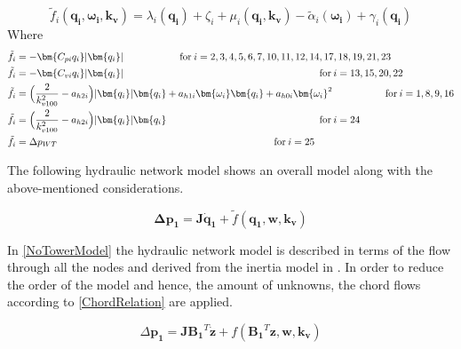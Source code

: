 
\begin{equation}
  \tilde{f}_i(\bm{q_{i}}, \bm{\omega_i}, \bm{k_v}) = \lambda_i(\bm{q_{i}}) + \zeta_i + \mu_i(\bm{q_{i}}, \bm{k_v}) - \tilde{\alpha}_i(\bm{\omega_i}) + \gamma_i (\bm{q_i})
  \label{ComponentFunction}
\end{equation}
Where\\
\begin{align}
\tilde{f}_i &= -\bm{C_{pi} q_i} |\bm{q_i}|  \hskip 2cm  \text{for}\: i = 2,3,4,5,6,7,10,11,12,14,17,18,19,21,23 \\
\tilde{f}_i &= -\bm{C_{vi} q_i} |\bm{q_i}|  \hspace{6.95cm} \text{for}\:i = 13,15,20,22\\
\tilde{f}_i &= \Big(\frac{2}{k_{v100}^2} - a_{h2i}\Big)|\bm{q_i}| \bm{q_i}  + a_{h1i} \bm{\omega_{i}} \bm{q_i} + a_{h0i}\bm{{\omega_i}}^2 \hspace{1.875cm} \text{for}\: i = 1,8,9,16 \\
\tilde{f}_i &= \Big(\frac{2}{k_{v100}^2} - a_{h2i}\Big)|\bm{q_i}| \bm{q_i}  \hspace{5.43cm} \text{for}\: i = 24 \\
\tilde{f}_i &= \Delta p_{WT}  \hspace{7.69cm} \text{for}\:i = 25
\end{align}

The following hydraulic network model shows an overall model along with the above-mentioned considerations.%

\begin{equation}
  \bm{\Delta p_1} =  \bm{J} \bm{\dot{q}_1} + \tilde{f}(\bm{q_1}, \bm{w}, \bm{k_v})
  \label{NoTowerModel}
\end{equation}

In \eqref{NoTowerModel} the hydraulic network model is described in terms of the 
flow through all the nodes and derived from the inertia model in . In order to reduce the order of the model and hence, 
the amount of unknowns, the chord flows according to \eqref{ChordRelation} are applied. 

\begin{equation}
  \Delta \bm{p_1} =  \bm{J} {\bm{B_1}}^T \bm{\dot{z}} + f({\bm{B_1}}^T \bm{z}, \bm{w}, \bm{k_v})
  \label{ChordsModel}
\end{equation}

